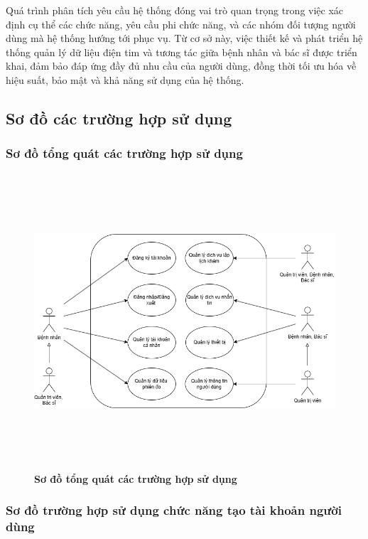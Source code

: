 Quá trình phân tích yêu cầu hệ thống đóng vai trò quan trọng trong việc xác định cụ thể các chức năng, yêu cầu phi chức năng, và các nhóm đối tượng người dùng mà hệ thống hướng tới phục vụ.
Từ cơ sở này, việc thiết kế và phát triển hệ thống quản lý dữ liệu điện tim và tương tác giữa bệnh nhân và bác sĩ được triển khai, đảm bảo đáp ứng đầy đủ nhu cầu của người dùng,
đồng thời tối ưu hóa về hiệu suất, bảo mật và khả năng sử dụng của hệ thống.

\subsection{Sơ đồ các trường hợp sử dụng}

\subsubsection{Sơ đồ tổng quát các trường hợp sử dụng}

\begin{figure}[H]
	\centering
	\includegraphics[width=16cm,height=11cm]{Images/use_case/use_case_general.png}
	\caption[Sơ đồ tổng quát các trường hợp sử dụng của hệ thống]{\bfseries \fontsize{12pt}{0pt}
		\selectfont Sơ đồ tổng quát các trường hợp sử dụng}
	\label{use_case_general} %
\end{figure}

\subsubsection{Sơ đồ trường hợp sử dụng chức năng tạo tài khoản người dùng}


